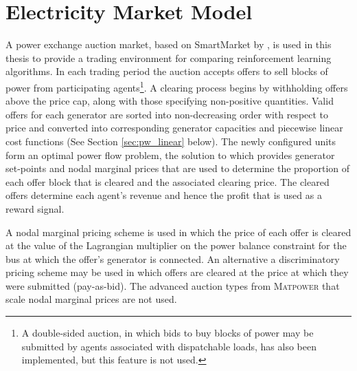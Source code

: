 \section{Electricity Market Model}
A power exchange auction market, based on SmartMarket by
, is used in this thesis to provide a trading
environment for comparing reinforcement learning algorithms.  In each trading
period the auction accepts offers to sell blocks of power from participating
agents\footnote{A double-sided auction, in which bids to buy blocks of power may
be submitted by agents associated with dispatchable loads, has also been
implemented, but this feature is not used.}.
A clearing process begins by withholding offers above the price cap, along with
those specifying non-positive quantities.  Valid offers for each generator are
sorted into non-decreasing order with respect to price and converted into
corresponding generator capacities and piecewise linear cost functions (See
Section \ref{sec:pw_linear} below).  The newly configured units form an optimal
power flow problem, the solution to which provides generator set-points and
nodal marginal prices that are used to determine the proportion of each offer
block that is cleared and the associated clearing price.  The cleared offers
determine each agent's revenue and hence the profit that is used as a reward
signal.


A nodal marginal pricing scheme is used in which the price of each offer is
cleared at the value of the Lagrangian multiplier on the power balance
constraint for the bus at which the offer's generator is connected. An
alternative a discriminatory pricing scheme may be used in which offers are
cleared at the price at which they were submitted (pay-as-bid).  The
advanced auction types from \textsc{Matpower} that scale nodal marginal prices
are not used.

